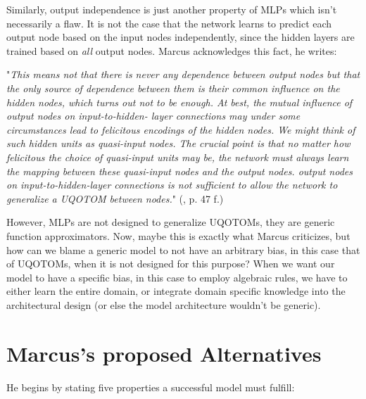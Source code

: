 \documentclass[../../main.tex]{subfiles}
\begin{document}
\begin{critique}
    Similarly, output independence is just another property of MLPs which isn't necessarily a flaw. It is not the case that the network learns to predict each output node based on the input nodes independently, since the hidden layers are trained based on \emph{all} output nodes.
    Marcus acknowledges this fact, he writes:

    "\emph{This means not that there is never any dependence between output
    nodes but that the only source of dependence between them is their common influence on the hidden nodes, which turns out not to be enough.
    At best, the mutual influence of output nodes on input-to-hidden-
    layer connections may under some circumstances lead to felicitous
    encodings of the hidden nodes. We might think of such hidden units
    as quasi-input nodes. The crucial point is that no matter how felicitous
    the choice of quasi-input units may be, the network must always learn
    the mapping between these quasi-input nodes and the output nodes.
    output nodes on input-to-hidden-layer connections is not sufficient
    to allow the network to generalize a UQOTOM between nodes.}" (\textcite{marcus_algebraic_mind}, p. 47 f.)

    However, MLPs are not designed to generalize UQOTOMs, they are generic function approximators. Now, maybe this is exactly what Marcus criticizes, but how can we blame a generic model to not have an arbitrary bias, in this case that of UQOTOMs, when it is not designed for this purpose? When we want our model to have a specific bias, in this case to employ algebraic rules, we have to either learn the entire domain, or integrate domain specific knowledge into the architectural design (or else the model architecture wouldn't be generic).
\end{critique}

\pagebreak
\section{Marcus's proposed Alternatives}
He begins by stating five properties a successful model must fulfill:
\end{document}

